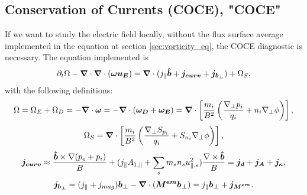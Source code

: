 \subsection{Conservation of Currents (COCE), "COCE"}\label{sec:COCE}
If we want to study the electric field locally, without the flux surface average implemented in the equation at section \ref{sec:vorticity_eq}, the COCE diagnostic is necessary. The equation implemented is 
\begin{equation}
    \partial_t\Omega-{\boldsymbol{\nabla}}\cdot{\boldsymbol{\nabla}}\cdot({\boldsymbol{\omega u_E}})={\boldsymbol{\nabla}}\cdot(j_\parallel\bm{\hat{b}}+{\boldsymbol{j_{curv}}}+{\boldsymbol{j_{b_\perp}}})+\Omega_S,
    \label{eq:COCE_diagnostic}
\end{equation}   
with the following definitions:
\begin{equation}
\Omega=\Omega_E+\Omega_D=-{\boldsymbol{\nabla}}\cdot{\boldsymbol{\omega}}=-{\boldsymbol{\nabla}}\cdot({\boldsymbol{\omega_D}}+{\boldsymbol{\omega_E}})={\boldsymbol{\nabla}}\cdot\left[\frac{m_i}{B^2}\left(\frac{\nabla_\perp p_i}{q_i}+n_i\nabla_\perp\phi\right)\right],
\end{equation}
\begin{equation}
    \Omega_S={\boldsymbol{\nabla}}\cdot\left[\frac{m_i}{B^2}\left(\frac{\nabla_\perp S_{p_i}}{q_i}+S_{n_i}\nabla_\perp\phi\right)\right],
\end{equation}
\begin{equation}
     {\boldsymbol{j_{curv}}}\approx\frac{\bm{\hat{b}}\times\nabla(p_e+p_i)}{B}+(j_\parallel A_{1,\parallel}+\sum_s m_s n_s u_{\parallel,s}^2) \frac{\nabla\times\bm{\hat{b}}}{B}={\boldsymbol{j_{d}}}+{\boldsymbol{j_A}}+{\boldsymbol{j_\kappa}},
\end{equation}
\begin{equation}
      {\boldsymbol{j_{b_\perp}}}=(j_\parallel+j_{mag}){\boldsymbol{b_\perp}}-{\boldsymbol{\nabla}}\cdot({\boldsymbol{M^{em}}}{\boldsymbol{b_\perp}})=j_\parallel{\boldsymbol{b_\perp}}+{\boldsymbol{j_{M^{em}}}}.
\end{equation}

